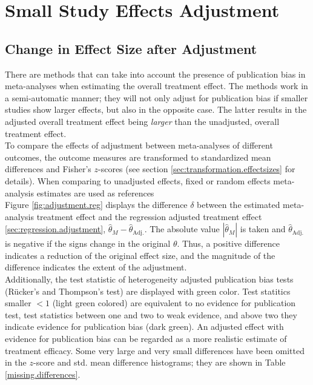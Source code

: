 \documentclass[11pt,a4paper,twoside]{book}\usepackage[]{graphicx}\usepackage[]{color}
\begin{document}

\section{Small Study Effects Adjustment}


\subsection{Change in Effect Size after Adjustment} \label{sec:change.size}

There are methods that can take into account the presence of publication bias in meta-analyses when estimating the overall treatment effect. The methods work in a semi-automatic manner; they will not only adjust for publication bias if smaller studies show larger effects, but also in the opposite case. The latter results in the adjusted overall treatment effect being \textit{larger} than the unadjusted, overall treatment effect. \\
To compare the effects of adjustment between meta-analyses of different outcomes, the outcome measures are transformed to standardized mean differences and Fisher's $z$-scores (see section \ref{sec:transformation.effectsizes} for details). When comparing to unadjusted effects, fixed or random effects meta-analysis estimates are used as references\\
Figure \ref{fig:adjustment.reg} displays the difference $\delta$ between the estimated meta-analysis treatment effect and the regression adjusted treatment effect \ref{sec:regression.adjustment}, $\hat{\theta}_M - \hat{\theta}_\textrm{Adj.}$. The absolute value $|\hat{\theta}_M|$ is taken and $\hat{\theta}_\textrm{Adj.}$ is negative if the signs change in the original $\theta$. Thus, a positive difference indicates a reduction of the original effect size, and the magnitude of the difference indicates the extent of the adjustment. \\
Additionally, the test statistic of heterogeneity adjusted publication bias tests (R\"ucker's and Thompson's test) are displayed with green color. Test statitics smaller $< 1$ (light green colored) are equivalent to no evidence for publication test, test statistics between one and two to weak evidence, and above two they indicate evidence for publication bias (dark green). An adjusted effect with evidence for publication bias can be regarded as a more realistic estimate of treatment efficacy. Some very large and very small differences have been omitted in the $z$-score and std. mean difference histograms; they are shown in Table \ref{missing.differences}. \\
\end{document}
